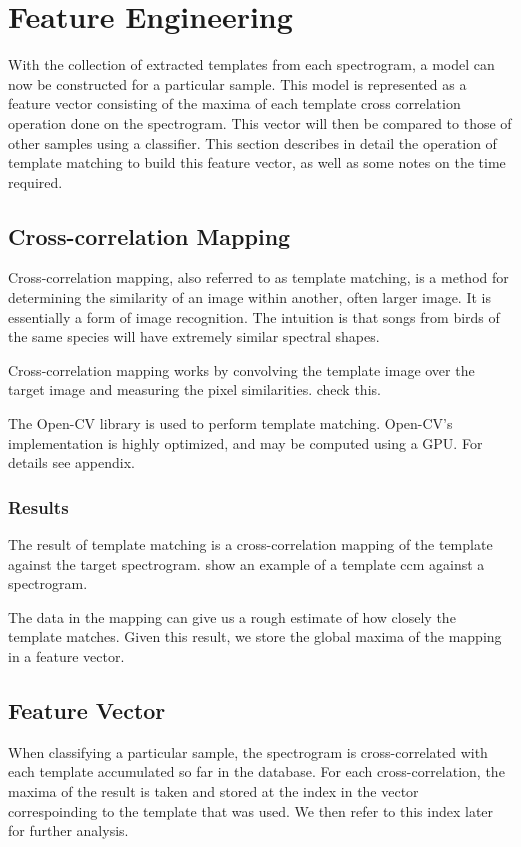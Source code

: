 \section{Feature Engineering}
With the collection of extracted templates from each spectrogram,
a model can now be constructed for a particular sample.
This model is represented as a feature vector consisting of the maxima
of each template cross correlation operation done on the spectrogram.
This vector will then be compared to those of other samples using a
classifier.
This section describes in detail the operation of template matching
to build this feature vector, as well as some notes on the time
required.

\subsection{Cross-correlation Mapping}
Cross-correlation mapping, also referred to as template matching, is
a method for determining the similarity of an image within another,
often larger image.
It is essentially a form of image recognition.
The intuition is that songs from birds of the same species will have
extremely similar spectral shapes.

Cross-correlation mapping works by convolving the template image
over the target image and measuring the pixel similarities.
check this.

The Open-CV library is used to perform template matching.
Open-CV's implementation is highly optimized, and may be computed
using a GPU. For details see appendix.

\subsubsection{Results}
The result of template matching is a cross-correlation mapping of the
template against the target spectrogram.
show an example of a template ccm against a spectrogram.

The data in the mapping can give us a rough estimate of how closely
the template matches.
Given this result, we store the global maxima of the mapping in a
feature vector.

\subsection{Feature Vector}
When classifying a particular sample, the spectrogram is cross-correlated
with each template accumulated so far in the database.
For each cross-correlation, the maxima of the result is taken and stored
at the index in the vector correspoinding to the template that was used.
We then refer to this index later for further analysis.

